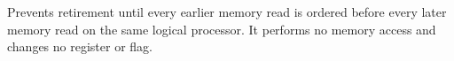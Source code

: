 Prevents retirement until every earlier memory read is ordered before every later memory read on the same logical processor. It performs no memory access and changes no register or flag.
